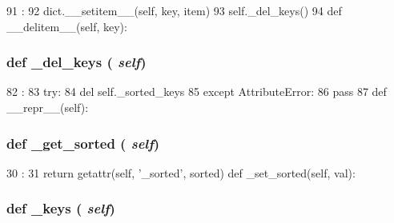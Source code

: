 \begin{DoxyCode}
91                                     :
92         dict.__setitem__(self, key, item)
93         self._del_keys()
94 
    def __delitem__(self, key):
\end{DoxyCode}
\hypertarget{classm5_1_1util_1_1sorteddict_1_1SortedDict_a8fcf3ad957c4d91952c16bf7319a050a}{
\subsubsection[{\_\-del\_\-keys}]{\setlength{\rightskip}{0pt plus 5cm}def \_\-del\_\-keys ( {\em self})}}
\label{classm5_1_1util_1_1sorteddict_1_1SortedDict_a8fcf3ad957c4d91952c16bf7319a050a}



\begin{DoxyCode}
82                        :
83         try:
84             del self._sorted_keys
85         except AttributeError:
86             pass
87 
    def __repr__(self):
\end{DoxyCode}
\hypertarget{classm5_1_1util_1_1sorteddict_1_1SortedDict_a2539ea1cd1d553bd77d7844b89f21b3e}{
\subsubsection[{\_\-get\_\-sorted}]{\setlength{\rightskip}{0pt plus 5cm}def \_\-get\_\-sorted ( {\em self})}}
\label{classm5_1_1util_1_1sorteddict_1_1SortedDict_a2539ea1cd1d553bd77d7844b89f21b3e}



\begin{DoxyCode}
30                          :
31         return getattr(self, '_sorted', sorted)
    def _set_sorted(self, val):
\end{DoxyCode}
\hypertarget{classm5_1_1util_1_1sorteddict_1_1SortedDict_a0bbd4b7e94da8d85f536d66c9d6c8ac0}{
\subsubsection[{\_\-keys}]{\setlength{\rightskip}{0pt plus 5cm}def \_\-keys ( {\em self})}}
\label{classm5_1_1util_1_1sorteddict_1_1SortedDict_a0bbd4b7e94da8d85f536d66c9d6c8ac0}



